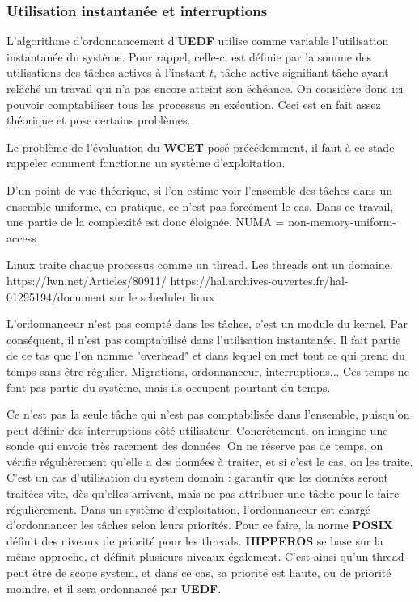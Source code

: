 	\subsubsection{Utilisation instantanée et interruptions}

	L'algorithme d'ordonnancement d'\textbf{UEDF} utilise comme variable l'utilisation instantanée du système. 
	Pour rappel, celle-ci est définie par la somme des utilisations des tâches actives à l'instant $t$, 
	tâche active signifiant tâche ayant relâché un travail qui n'a pas encore atteint son échéance. 
	On considère donc ici pouvoir comptabiliser tous les processus en exécution. Ceci est 
	en fait assez théorique et pose certains problèmes.
	
	Le problème de l'évaluation du \textbf{WCET} posé précédemment, il faut à ce stade rappeler comment 
	fonctionne un système d'exploitation.
	
	D'un point de vue théorique, si l'on estime voir l'ensemble des tâches dans un ensemble uniforme, 
	en pratique, ce n'est pas forcément le cas. Dans ce travail, une partie de la complexité est 
	donc éloignée. NUMA = non-memory-uniform-access
	
	Linux traite chaque processus comme un thread. Les threads ont un domaine. 
	https://lwn.net/Articles/80911/
	https://hal.archives-ouvertes.fr/hal-01295194/document  sur le scheduler linux
	

	L'ordonnanceur n'est pas compté dans les tâches, c'est un module du kernel. Par conséquent, il n'est pas comptabilisé 
	dans l'utilisation instantanée. Il fait partie de ce tas que l'on nomme "overhead" et dans lequel 
	on met tout ce qui prend du temps sans être régulier. 
	Migrations, ordonnanceur, interruptions... Ces temps ne font pas partie du système, mais ils occupent
	pourtant du temps.
	
	Ce n'est pas la seule tâche qui n'est pas comptabilisée dans l'ensemble, puisqu'on peut définir des 
	interruptions côté utilisateur. 
	Concrètement, on imagine une sonde qui envoie très rarement des données. On ne réserve 
	pas de temps, on vérifie régulièrement qu'elle a des données à traiter, et si c'est le cas, on les traite.\\
	C'est un cas d'utilisation du system domain : garantir que les données seront traitées vite, dès qu'elles arrivent, 
	mais ne pas attribuer une tâche pour le faire régulièrement.
	Dans un système d'exploitation, l'ordonnanceur est chargé d'ordonnancer les tâches selon leurs priorités. 
	Pour ce faire, la norme \textbf{POSIX} définit des niveaux de priorité pour les threads. 
	\textbf{HIPPEROS }se base sur la même approche, et définit plusieurs niveaux également. C'est ainsi 
	qu'un thread peut être de scope system, et dans ce cas, sa priorité est haute, ou de priorité 
	moindre, et il sera ordonnancé par \textbf{UEDF}.\newline
	
